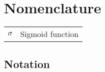 \bgroup
\raggedbottom


\chapter*{Nomenclature}


\begin{tabular}{rl}
        $\sigma$      & Sigmoid function\\
\end{tabular}



\renewcommand{\listfigurename}{\Large List of Figures}
\disablenewpage{\listoffigures}

\renewcommand{\listtablename}{\Large List of Tables}
\disablenewpage{\listoftables}


\renewcommand{\listalgorithmname}{\Large List of Algorithms}
\disablenewpage{\listofalgorithms}


\section*{Notation}

